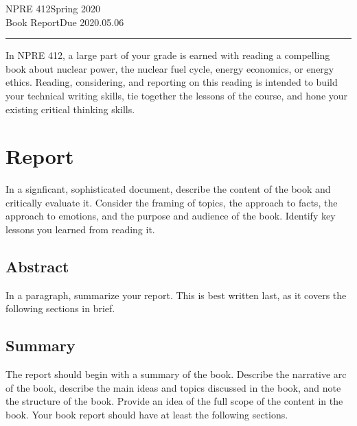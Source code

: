 \documentclass{article}
\newcommand{\class}{NPRE 412}
\newcommand{\term}{Spring 2020}
\newcommand{\assignment}{Book Report}
\newcommand{\duedate}{2020.05.06}
\begin{document}
 


\class \hfill \term \\
\assignment \hfill Due \duedate\\
\rule[1ex]{\textwidth}{.1pt}


In NPRE 412, a large part of your grade is earned with reading a compelling 
book about nuclear power, the nuclear fuel cycle, energy economics, or energy 
ethics. Reading, considering, and reporting on this reading is intended to 
build your technical writing skills, tie together the lessons of the course, 
and hone your existing critical thinking skills.

\section{Report}
In a signficant, sophisticated document, describe the content of the book and 
critically evaluate it. Consider the framing of topics, the approach to facts, 
the approach to emotions, and the purpose and audience of the book. Identify 
key lessons you learned from reading it.

\subsection{Abstract}
In a paragraph, summarize your report. This is best written last, as it covers the following sections in brief.

\subsection{Summary}
The report should begin with a summary of the book. Describe the narrative arc 
of the book, describe the main ideas and topics discussed in the book, and note 
the structure of the book. Provide an idea of the full scope of the content in 
the book. Your book report should have at least the following sections.
\end{document}
